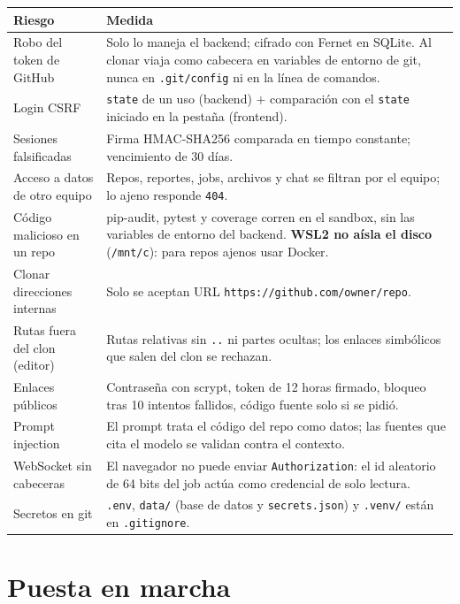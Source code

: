 \documentclass[11pt,a4paper]{article}
\newcommand{\code}[1]{\texttt{\small #1}}
\begin{document}
\begin{center}
\begin{tabularx}{\linewidth}{@{}lL@{}}
\toprule
\textbf{Riesgo} & \textbf{Medida} \\
\midrule
Robo del token de GitHub & Solo lo maneja el backend; cifrado con Fernet en SQLite. Al clonar viaja como cabecera en variables de entorno de git, nunca en \code{.git/config} ni en la línea de comandos. \\
Login CSRF & \code{state} de un uso (backend) + comparación con el \code{state} iniciado en la pestaña (frontend). \\
Sesiones falsificadas & Firma HMAC-SHA256 comparada en tiempo constante; vencimiento de 30 días. \\
Acceso a datos de otro equipo & Repos, reportes, jobs, archivos y chat se filtran por el equipo; lo ajeno responde \code{404}. \\
Código malicioso en un repo & pip-audit, pytest y coverage corren en el sandbox, sin las variables de entorno del backend. \textbf{WSL2 no aísla el disco} (\code{/mnt/c}): para repos ajenos usar Docker. \\
Clonar direcciones internas & Solo se aceptan URL \code{https://github.com/owner/repo}. \\
Rutas fuera del clon (editor) & Rutas relativas sin \code{..} ni partes ocultas; los enlaces simbólicos que salen del clon se rechazan. \\
Enlaces públicos & Contraseña con scrypt, token de 12 horas firmado, bloqueo tras 10 intentos fallidos, código fuente solo si se pidió. \\
Prompt injection & El prompt trata el código del repo como datos; las fuentes que cita el modelo se validan contra el contexto. \\
WebSocket sin cabeceras & El navegador no puede enviar \code{Authorization}: el id aleatorio de 64 bits del job actúa como credencial de solo lectura. \\
Secretos en git & \code{.env}, \code{data/} (base de datos y \code{secrets.json}) y \code{.venv/} están en \code{.gitignore}. \\
\bottomrule
\end{tabularx}
\end{center}

\section{Puesta en marcha}
\end{document}
